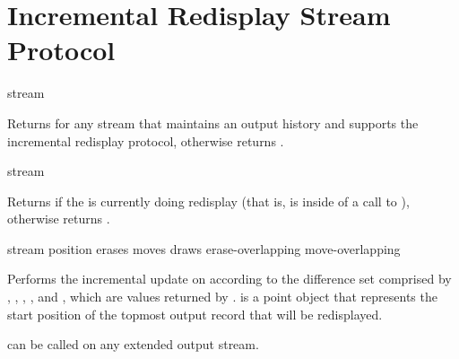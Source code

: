 \section {Incremental Redisplay Stream Protocol}

 {stream}

Returns  for any stream that maintains an output history and supports
the incremental redisplay protocol, otherwise returns .

 {stream}

Returns  if the  is currently doing redisplay (that is,
is inside of a call to ), otherwise returns .

 {stream position
                                     erases moves draws erase-overlapping move-overlapping} 

Performs the incremental update on  according to the difference set
comprised by , , , ,
and , which are values returned by
.   is a point object that represents
the start position of the topmost output record that will be redisplayed.

 can be called on any extended output stream.
